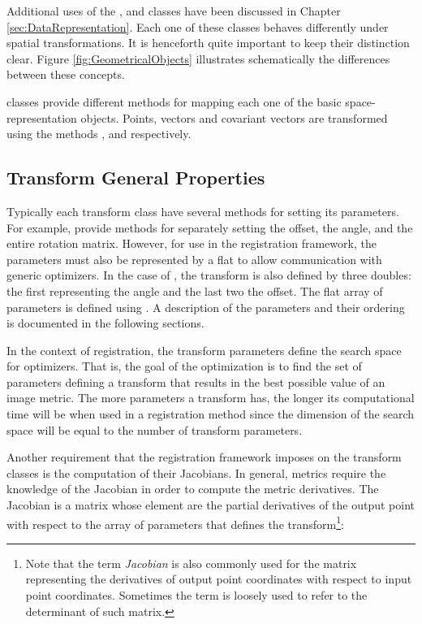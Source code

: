 Additional uses of the ,  and 
classes have been discussed in Chapter \ref{sec:DataRepresentation}.  Each one
of these classes behaves differently under spatial transformations. It is
henceforth quite important to keep their distinction clear. Figure
\ref{fig:GeometricalObjects} illustrates schematically the differences between
these concepts.



 classes provide different methods for mapping each one of
the basic space-representation objects.  Points, vectors and covariant vectors
are transformed using the methods ,
 and  respectively.

\subsection{Transform General Properties}
\label{sec:TransformGeneralProperties}

Typically each transform class have several methods for setting its parameters.
For example,  provide methods for separately setting the
offset, the angle, and the entire rotation matrix.  However, for use in the
registration framework, the parameters must also be represented by a flat
 to allow communication with generic optimizers. In the
case of , the transform is also defined by three
doubles: the first representing the angle and the last two the offset. The flat
array of parameters is defined using . A description of
the parameters and their ordering is documented in the following sections.
 
In the context of registration, the transform parameters define the search
space for optimizers. That is, the goal of the optimization is to find the set
of parameters defining a transform that results in the best possible value of
an image metric. The more parameters a transform has, the longer its
computational time will be when used in a registration method since the
dimension of the search space will be equal to the number of transform
parameters.


Another requirement that the registration framework imposes on the transform
classes is the computation of their Jacobians. In general, metrics require the
knowledge of the Jacobian in order to compute the metric derivatives.  The
Jacobian is a matrix whose element are the partial derivatives of the output
point with respect to the array of parameters that defines the
transform\footnote{Note that the term \emph{Jacobian} is also commonly used for
the matrix representing the derivatives of output point coordinates with
respect to input point coordinates. Sometimes the term is loosely used to refer
to the determinant of such matrix.}:

